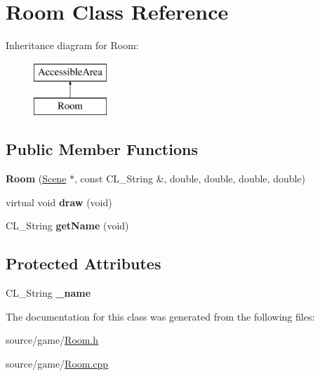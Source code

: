 \hypertarget{classRoom}{
\section{Room Class Reference}
\label{classRoom}
}
Inheritance diagram for Room:\begin{figure}[H]
\begin{center}
\leavevmode
\includegraphics[height=2cm]{classRoom}
\end{center}
\end{figure}
\subsection*{Public Member Functions}
\begin{DoxyCompactItemize}
\item 
\hypertarget{classRoom_a9a37ede1e93c8017f5cb06251055b6b1}{
{\bfseries Room} (\hyperlink{classScene}{Scene} $\ast$, const CL\_\-String \&, double, double, double, double)}
\label{classRoom_a9a37ede1e93c8017f5cb06251055b6b1}

\item 
\hypertarget{classRoom_ac0b17aaf2c3e3c2e0aff771a7a2b7741}{
virtual void {\bfseries draw} (void)}
\label{classRoom_ac0b17aaf2c3e3c2e0aff771a7a2b7741}

\item 
\hypertarget{classRoom_a4bd0c09c66baa527f0ff42a0b139b867}{
CL\_\-String {\bfseries getName} (void)}
\label{classRoom_a4bd0c09c66baa527f0ff42a0b139b867}

\end{DoxyCompactItemize}
\subsection*{Protected Attributes}
\begin{DoxyCompactItemize}
\item 
\hypertarget{classRoom_af2553b29ae9bfa4412c1de23d11a2f4b}{
CL\_\-String {\bfseries \_\-name}}
\label{classRoom_af2553b29ae9bfa4412c1de23d11a2f4b}

\end{DoxyCompactItemize}


The documentation for this class was generated from the following files:\begin{DoxyCompactItemize}
\item 
source/game/\hyperlink{Room_8h}{Room.h}\item 
source/game/\hyperlink{Room_8cpp}{Room.cpp}\end{DoxyCompactItemize}
